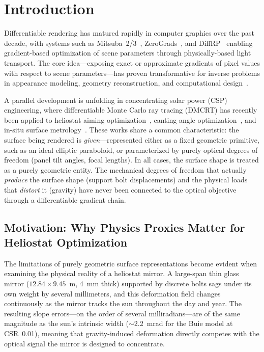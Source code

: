 \documentclass{CVM}
\begin{document}
\maketitle

\section{Introduction}

Differentiable rendering has matured rapidly in computer graphics over the
past decade, with systems such as Mitsuba~2/3~\cite{mitsuba2,mitsuba3},
ZeroGrads~\cite{zerograds}, and DiffRP~\cite{diffrp} enabling gradient-based
optimization of scene parameters through physically-based light transport. The
core idea---exposing exact or approximate gradients of pixel values with
respect to scene parameters---has proven transformative for inverse problems in
appearance modeling, geometry reconstruction, and computational
design~\cite{jakob2022dr}.

A parallel development is unfolding in concentrating solar power (CSP)
engineering, where differentiable Monte Carlo ray tracing (DMCRT) has recently
been applied to heliostat aiming optimization~\cite{aiming2025},
canting angle optimization~\cite{canting2025}, and in-situ surface
metrology~\cite{pargmann2024,inverse2025a,inverse2025b}. These works share a
common characteristic: the surface being rendered is \emph{given}---represented
either as a fixed geometric primitive, such as an ideal elliptic paraboloid, or
parameterized by purely optical degrees of freedom (panel tilt angles, focal
lengths). In all cases, the surface shape is treated as a purely geometric
entity. The mechanical degrees of freedom that actually \emph{produce} the
surface shape (support bolt displacements) and the physical loads that
\emph{distort} it (gravity) have never been connected to the optical objective
through a differentiable gradient chain.

\subsection{Motivation: Why Physics Proxies Matter for Heliostat Optimization}

The limitations of purely geometric surface representations become evident when
examining the physical reality of a heliostat mirror. A large-span thin glass
mirror ($12.84 \times 9.45$~m, 4~mm thick) supported by discrete bolts sags
under its own weight by several millimeters, and this deformation field changes
continuously as the mirror tracks the sun throughout the day and year. The
resulting slope errors---on the order of several milliradians---are of the same
magnitude as the sun's intrinsic width ($\sim$2.2~mrad for the Buie model at
CSR~0.01), meaning that gravity-induced deformation directly competes with the
optical signal the mirror is designed to concentrate.
\end{document}
